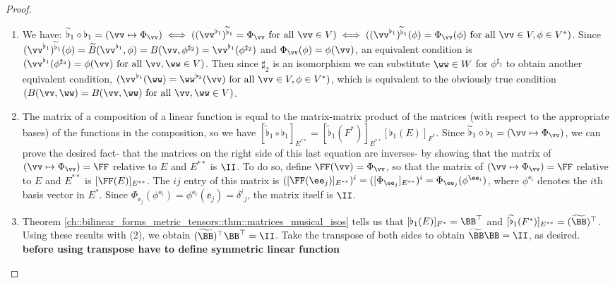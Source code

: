\begin{proof}
    \hspace{0mm} \\
    \begin{enumerate}
        \item We have: $\widetilde{\flat}_1 \circ \flat_1 = (\vv \mapsto \Phi_\vv) \iff  ((\vv^{\flat_1})^{\widetilde{\flat}_1} = \Phi_\vv \text{ for all $\vv \in V$}) \iff
        ((\vv^{\flat_1})^{\widetilde{\flat}_1}(\phi) = \Phi_\vv(\phi) \text{ for all $\vv \in V, \phi \in V^*$})$. Since $(\vv^{\flat_1})^{\widetilde{\flat}_1}(\phi) = \widetilde{B}(\vv^{\flat_1}, \phi) = B(\vv, \phi^{\sharp_2}) = \vv^{\flat_1}(\phi^{\sharp_2})$ and $\Phi_\vv(\phi) = \phi(\vv)$, an equivalent condition is $(\vv^{\flat_1}(\phi^{\sharp_2}) = \phi(\vv) \text{ for all $\vv, \ww \in V$})$. Then since $\sharp_2$ is an isomorphism we can substitute $\ww \in W$ for $\phi^{\sharp_2}$ to obtain another equivalent condition, $(\vv^{\flat_1}(\ww) = \ww^{\flat_2}(\vv) \text{ for all $\vv \in V, \phi \in V^*$})$, which is equivalent to the obviously true condition $(B(\vv, \ww) = B(\vv, \ww) \text{ for all $\vv, \ww \in V$})$.
        
        \item The matrix of a composition of a linear function is equal to the matrix-matrix product of the matrices (with respect to the appropriate bases) of the functions in the composition, so we have $[\widetilde{\flat}_1 \circ \flat_1]_{E^{**}} = [\widetilde{\flat}_1(F^*)]_{E^{**}} [\flat_1(E)]_{F^*}$. Since $\widetilde{\flat}_1 \circ \flat_1 = (\vv \mapsto \Phi_\vv)$, we can prove the desired fact- that the matrices on the right side of this last equation are inverses- by showing that the matrix of $(\vv \mapsto \Phi_\vv) = \FF$ relative to $E$ and $E^{**}$ is $\II$. To do so, define $\FF(\vv) = \Phi_\vv$, so that the matrix of $(\vv \mapsto \Phi_\vv) = \FF$ relative to $E$ and $E^{**}$ is $[\FF(E)]_{E^{**}}$. The $ij$ entry of this matrix is $([\FF(\ee_j)]_{E^{**}})^i = ([\Phi_{\ee_j}]_{E^{**}})^i = \Phi_{\ee_j}(\phi^{\ee_i})$, where $\phi^{\ee_i}$ denotes the $i$th basis vector in $E^*$. Since $\Phi_{\ee_j}(\phi^{\ee_i}) = \phi^{\ee_i}(\ee_j) = \delta^i{}_j$, the matrix itself is $\II$.
        \item Theorem \ref{ch::bilinear_forms_metric_tensors::thm::matrices_musical_isos} tells us that $[\flat_1(E)]_{F^*} = \BB^\top$ and $[\widetilde{\flat}_1(F^*)]_{E^{**}} = (\widetilde{\BB})^\top$. Using these results with (2), we obtain $(\widetilde{\BB})^\top \BB^\top = \II$. Take the transpose of both sides to obtain $\widetilde{\BB} \BB = \II$, as desired. \textbf{before using transpose have to define symmetric linear function}
    \end{enumerate}
\end{proof}

